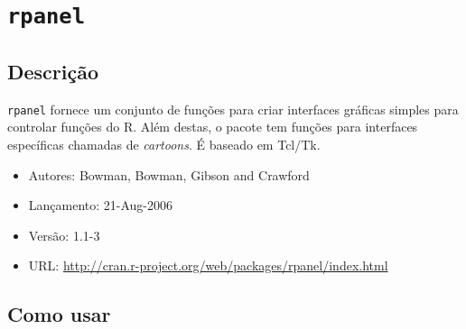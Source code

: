 \section{\texttt{rpanel}}

\subsection{Descrição}


\begin{frame}

  \texttt{rpanel} fornece um conjunto de funções para criar interfaces
  gráficas simples para controlar funções do R. Além destas, o pacote
  tem funções para interfaces específicas chamadas de \emph{cartoons}. É
  baseado em Tcl/Tk.

  \begin{itemize}
  \item Autores: Bowman, Bowman, Gibson and Crawford
  \item Lançamento: 21-Aug-2006
  \item Versão: 1.1-3
  \item URL:
    \url{http://cran.r-project.org/web/packages/rpanel/index.html}
\end{itemize}

\end{frame}


\subsection{Como usar}


